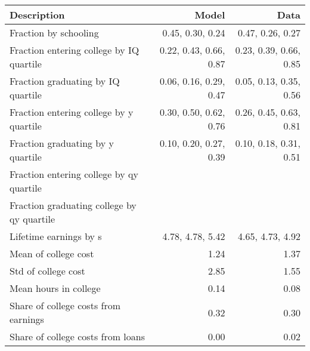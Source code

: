 \begin{tabular}{lrr}
\hline
Description & Model  & Data  \\
\hline
Fraction by schooling & 0.45, 0.30, 0.24  & 0.47, 0.26, 0.27  \\
Fraction entering college by IQ quartile & 0.22, 0.43, 0.66, 0.87  & 0.23, 0.39, 0.66, 0.85  \\
Fraction graduating by IQ quartile & 0.06, 0.16, 0.29, 0.47  & 0.05, 0.13, 0.35, 0.56  \\
Fraction entering college by y quartile & 0.30, 0.50, 0.62, 0.76  & 0.26, 0.45, 0.63, 0.81  \\
Fraction graduating by y quartile & 0.10, 0.20, 0.27, 0.39  & 0.10, 0.18, 0.31, 0.51  \\
Fraction entering college by qy quartile &   &   \\
Fraction graduating college by qy quartile &   &   \\
Lifetime earnings by s & 4.78, 4.78, 5.42  & 4.65, 4.73, 4.92  \\
Mean of college cost & 1.24  & 1.37  \\
Std of college cost & 2.85  & 1.55  \\
Mean hours in college & 0.14  & 0.08  \\
Share of college costs from earnings & 0.32  & 0.30  \\
Share of college costs from loans & 0.00  & 0.02  \\
\hline
\end{tabular}%
